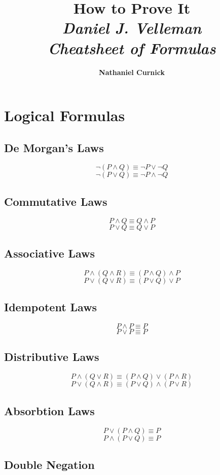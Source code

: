 \documentclass[11pt]{article}
\title{\textbf{How to Prove It} \\ {\Large\itshape Daniel J. Velleman} \\ {\Large\itshape Cheatsheet of Formulas}}
\author{\textbf{Nathaniel Curnick}}
\date{}
\begin{document}
\maketitle

\section{Logical Formulas}

\subsection{De Morgan's Laws}

$$\neg (P \wedge Q) \equiv \neg P \vee \neg Q$$
$$\neg (P \vee Q) \equiv \neg P \wedge \neg Q$$

\subsection{Commutative Laws}

$$P \wedge Q \equiv Q \wedge P$$
$$P \vee Q \equiv Q \vee P$$

\subsection{Associative Laws}

$$P \wedge (Q \wedge R) \equiv  (P \wedge Q) \wedge P$$
$$P \vee (Q \vee R) \equiv  (P \vee Q) \vee P$$

\subsection{Idempotent Laws}

$$P \wedge P \equiv P$$
$$P \vee P \equiv P$$

\subsection{Distributive Laws}

$$P \wedge (Q \vee R) \equiv (P \wedge Q) \vee (P \wedge R)$$
$$P \vee (Q \wedge R) \equiv (P \vee Q) \wedge (P \vee R)$$

\subsection{Absorbtion Laws}

$$P \vee (P \wedge Q) \equiv P$$
$$P \wedge (P \vee Q) \equiv P$$

\subsection{Double Negation}
\end{document}
